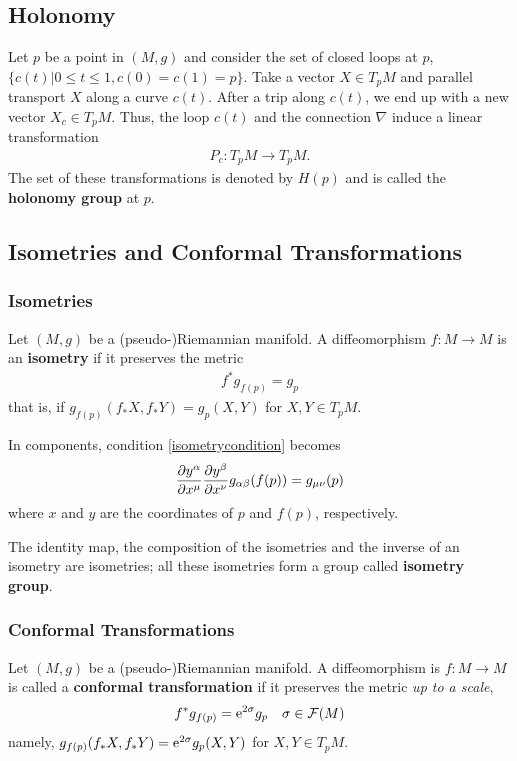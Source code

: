 \documentclass[10pt]{article}
\begin{document}
\subsection{Holonomy}
\begin{definition}
    Let $p$ be a point in $(M,g)$ and consider the set of closed loops at $p$, $\{c(t)|0\leq t\leq1,c(0)=c(1)=p\}$.
    Take a vector $X\in T_p M$ and parallel transport $X$ along a curve $c(t)$.
    After a trip along $c(t)$, we end up with a new vector $X_c\in T_p M$.
    Thus, the loop $c(t)$ and the connection $\nabla$ induce a linear transformation
    \begin{align}
        P_c:T_p M\to T_p M.
    \end{align}
    The set of these transformations is denoted by $H(p)$ and is called the \textbf{holonomy group} at $p$.
\end{definition}
\subsection{Isometries and Conformal Transformations}
\subsubsection{Isometries}
\begin{definition}[Isometry]
    Let $(M,g)$ be a (pseudo-)Riemannian manifold.
    A diffeomorphism $f:M\to M$ is an \textbf{isometry} if it preserves the metric
    \begin{align}
        f^*g_{f(p)}=g_p\label{isometrycondition}
    \end{align}
    that is, if $g_{f(p)}(f_*X,f_*Y)=g_p(X,Y)$ for $X,Y\in T_p M$.
\end{definition}

In components, condition \eqref{isometrycondition} becomes
\begin{align}
    \pdv{y^\alpha}{x^\mu}\pdv{y^\beta}{x^\nu}g_{\alpha\beta}(f(p))=g_{\mu\nu}(p)\label{isometrycomponent}
\end{align}
where $x$ and $y$ are the coordinates of $p$ and $f(p)$, respectively.

The identity map, the composition of the isometries and the inverse of an isometry are isometries;
all these isometries form a group called \textbf{isometry group}.

\subsubsection{Conformal Transformations}
\begin{definition}
    Let $(M,g)$ be a (pseudo-)Riemannian manifold.
    A diffeomorphism is $f:M\to M$ is called a \textbf{conformal transformation} if it preserves the metric \textit{up to a scale},
    \begin{align}
        f^*g_{f(p)}=\mathrm{e}^{2\sigma}g_p\quad\sigma\in\mathcal{F}(M)
    \end{align}
    namely, $g_{f(p)}(f_*X,f_*Y)=\mathrm{e}^{2\sigma}g_p(X,Y)$ for $X,Y\in T_pM$.
\end{definition}
\end{document}
